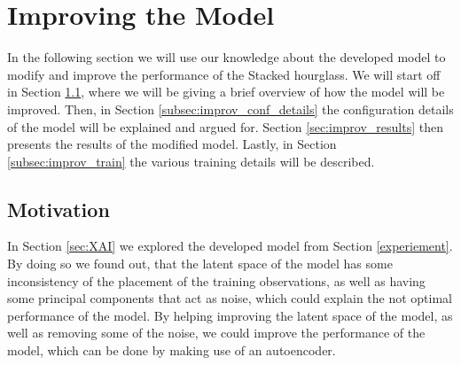 \documentclass[./main.tex]{subfiles}
\begin{document}
\section{Improving the Model}\label{sec:improving}
In the following section we will use our knowledge about the developed model to modify and improve the performance of the Stacked hourglass. We will start off in Section \ref{subsec:improv_motivation}, where we will be giving a brief overview of how the model will be improved. Then, in Section \ref{subsec:improv_conf_details} the configuration details of the model will be explained and argued for. Section \ref{sec:improv_results} then presents the results of the modified model. Lastly, in Section \ref{subsec:improv_train} the various training details will be described.

\subsection{Motivation}\label{subsec:improv_motivation}
In Section \ref{sec:XAI} we explored the developed model from Section \ref{experiement}. By doing so we found out, that the latent space of the model has some inconsistency of the placement of the training observations, as well as having some principal components that act as noise, which could explain the not optimal performance of the model. By helping improving the latent space of the model, as well as removing some of the noise, we could improve the performance of the model, which can be done by making use of an autoencoder.
\end{document}
